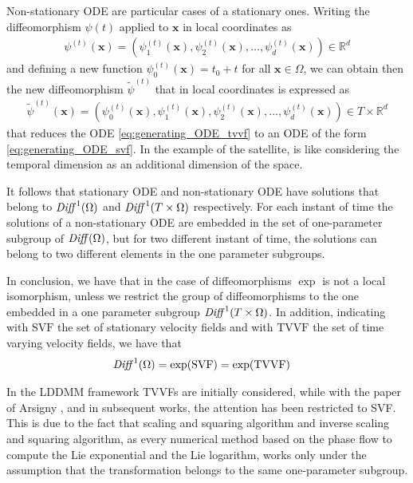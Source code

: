 Non-stationary ODE are particular cases of a stationary ones. Writing the diffeomorphism $\psi(t)$ applied to $\mathbf{x}$ in local coordinates as 
\begin{align*}
\psi^{(t)}(\mathbf{x}) = (\psi_1^{(t)}(\mathbf{x}), \psi_2^{(t)}(\mathbf{x}), \dots ,\psi_d^{(t)}(\mathbf{x})) \in \mathbb{R}^{d}
\end{align*}
and defining a new function $\psi_0^{(t)}(\mathbf{x}) = t_0 + t$ for all $\mathbf{x} \in \Omega$, we can obtain then the new diffeomorphism $\tilde{\psi}^{(t)}$ that in local coordinates is expressed as 
\begin{align*}
\tilde{\psi}^{(t)}(\mathbf{x}) = (\psi_0^{(t)}(\mathbf{x}), \psi_1^{(t)}(\mathbf{x}), \psi_2^{(t)}(\mathbf{x}), \dots ,\psi_d^{(t)}(\mathbf{x})) \in T\times \mathbb{R}^{d}
\end{align*}
that reduces the ODE \ref{eq:generating_ODE_tvvf} to an ODE of the form \ref{eq:generating_ODE_svf}. In the example of the satellite, is like considering the temporal dimension as an additional dimension of the space.

It follows that stationary ODE and non-stationary ODE have solutions that belong to $\text{\emph{Diff}}^{1}(\Omega)$ and $\text{\emph{Diff}}^{1}(T\times \Omega)$ respectively. For each instant of time the solutions of a non-stationary ODE are embedded in the set of one-parameter subgroup of $\text{\emph{Diff}}(\Omega)$, but for two different instant of time, the solutions can belong to two different elements in the one parameter subgroups. 

In conclusion, we have that in the case of diffeomorphisms $\exp$ is not a local isomorphism, unless we restrict the group of diffeomorphisms to the one embedded in a one parameter subgroup $\text{\emph{Diff}}^{1}(T\times \Omega)$. In addition, indicating with $\text{SVF}$ the set of stationary velocity fields and with $\text{TVVF}$ the set of time varying velocity fields, we have that
\begin{align*}
\text{\emph{Diff}}^{1}(\Omega) &= \exp(\text{SVF}) = \exp(\text{TVVF})
\end{align*}

In the LDDMM framework \cite{beg2005computing} TVVFs are initially considered, while with the paper of Arsigny \cite{arsigny2006log}, and in subsequent works, the attention has been restricted to SVF. 
This is due to the fact that scaling and squaring algorithm and inverse scaling and squaring algorithm, as every numerical method based on the phase flow to compute the Lie exponential and the Lie logarithm, works only under the assumption that the transformation belongs to the same one-parameter subgroup.


